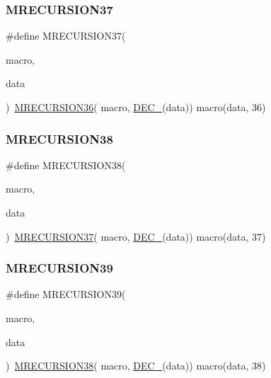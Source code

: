 \subsubsection{\texorpdfstring{MRECURSION37}{MRECURSION37}}
{\footnotesize\ttfamily \#define M\+R\+E\+C\+U\+R\+S\+I\+O\+N37(\begin{DoxyParamCaption}\item[{}]{macro,  }\item[{}]{data }\end{DoxyParamCaption})~\mbox{\hyperlink{group__group__sam0__utils__mrecursion_gaedf0d84c05535e2176c874e6e33ee175}{M\+R\+E\+C\+U\+R\+S\+I\+O\+N36}}(  macro, \mbox{\hyperlink{group__group__sam0__utils__mrecursion_ga1d23d683797679dca8c3512a54a5dcae}{D\+E\+C\+\_\+}}(data))   macro(data, 36)}

\mbox{\label{group__group__sam0__utils__mrecursion_ga88be78dfd27dc8ef724cd937c81715ef}} 
\subsubsection{\texorpdfstring{MRECURSION38}{MRECURSION38}}
{\footnotesize\ttfamily \#define M\+R\+E\+C\+U\+R\+S\+I\+O\+N38(\begin{DoxyParamCaption}\item[{}]{macro,  }\item[{}]{data }\end{DoxyParamCaption})~\mbox{\hyperlink{group__group__sam0__utils__mrecursion_gaae1f3283975fe24b9f70597329a3e87f}{M\+R\+E\+C\+U\+R\+S\+I\+O\+N37}}(  macro, \mbox{\hyperlink{group__group__sam0__utils__mrecursion_ga1d23d683797679dca8c3512a54a5dcae}{D\+E\+C\+\_\+}}(data))   macro(data, 37)}

\mbox{\label{group__group__sam0__utils__mrecursion_ga39b95086189f23b6fab245afd2b34d76}} 
\subsubsection{\texorpdfstring{MRECURSION39}{MRECURSION39}}
{\footnotesize\ttfamily \#define M\+R\+E\+C\+U\+R\+S\+I\+O\+N39(\begin{DoxyParamCaption}\item[{}]{macro,  }\item[{}]{data }\end{DoxyParamCaption})~\mbox{\hyperlink{group__group__sam0__utils__mrecursion_ga88be78dfd27dc8ef724cd937c81715ef}{M\+R\+E\+C\+U\+R\+S\+I\+O\+N38}}(  macro, \mbox{\hyperlink{group__group__sam0__utils__mrecursion_ga1d23d683797679dca8c3512a54a5dcae}{D\+E\+C\+\_\+}}(data))   macro(data, 38)}

